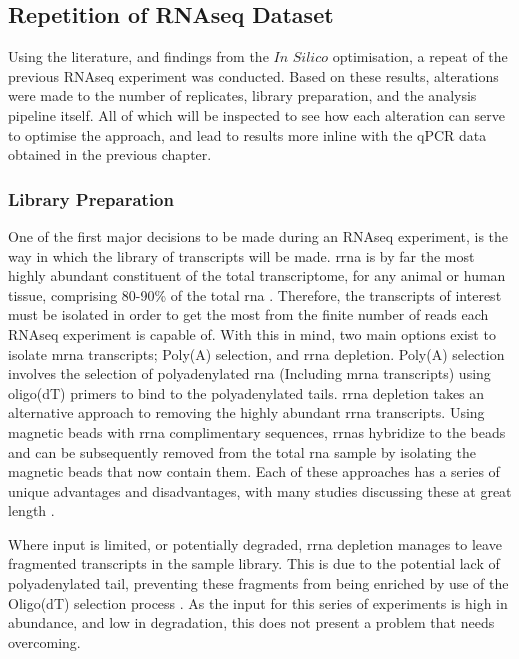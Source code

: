 \subsection{Repetition of RNAseq Dataset}

Using the literature, and findings from the $\textit{In Silico}$ optimisation, a repeat of the previous RNAseq experiment was conducted. Based on these results, alterations were made to the number of replicates, library preparation, and the analysis pipeline itself. All of which will be inspected to see how each alteration can serve to optimise the approach, and lead to results more inline with the qPCR data obtained in the previous chapter. 

\subsubsection{Library Preparation}

One of the first major decisions to be made during an RNAseq experiment, is the way in which the library of transcripts will be made. \acrfull{rrna} is by far the most highly abundant constituent of the total transcriptome, for any animal or human tissue, comprising 80-90\% of the total \acrshort{rna} \cite{ONeil2013}. Therefore, the transcripts of interest must be isolated in order to get the most from the finite number of reads each RNAseq experiment is capable of. With this in mind, two main options exist to isolate \acrshort{mrna} transcripts; Poly(A) selection, and \acrshort{rrna} depletion. Poly(A) selection involves the selection of polyadenylated \acrshort{rna} (Including \acrshort{mrna} transcripts) using oligo(dT) primers to bind to the polyadenylated tails. \acrshort{rrna} depletion takes an alternative approach to removing the highly abundant \acrshort{rrna} transcripts. Using magnetic beads with \acrshort{rrna} complimentary sequences, \acrshort{rrna}s hybridize to the beads and can be subsequently removed from the total \acrshort{rna} sample by isolating the magnetic beads that now contain them.  Each of these approaches has a series of unique advantages and disadvantages, with many studies discussing these at great length \cite{Kumar2017,Schuierer2017,Guo2015,Alberti2014}. 

Where input is limited, or potentially degraded, \acrshort{rrna} depletion manages to leave fragmented transcripts in the sample library. This is due to the potential lack of polyadenylated tail, preventing these fragments from being enriched by use of the Oligo(dT) selection process \cite{Kumar2017,Schuierer2017,Alberti2014}. As the input for this series of experiments is high in abundance, and low in degradation, this does not present a problem that needs overcoming. 

